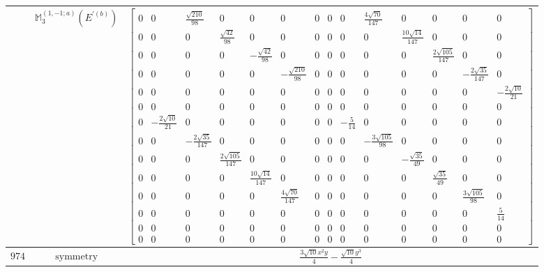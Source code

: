 \documentclass[fleqn,8pt,landscape]{jsarticle}
\begin{document}
\begin{longtable}{ccc}
$  $ & $ \mathbb{M}_{3}^{(1,-1;a)}(E^{\prime(b)}) $ & $ \begin{bmatrix} 0 & 0 & \frac{\sqrt{210}}{98} & 0 & 0 & 0 & 0 & 0 & 0 & \frac{4 \sqrt{70}}{147} & 0 & 0 & 0 & 0 \\ 0 & 0 & 0 & \frac{\sqrt{42}}{98} & 0 & 0 & 0 & 0 & 0 & 0 & \frac{10 \sqrt{14}}{147} & 0 & 0 & 0 \\ 0 & 0 & 0 & 0 & - \frac{\sqrt{42}}{98} & 0 & 0 & 0 & 0 & 0 & 0 & \frac{2 \sqrt{105}}{147} & 0 & 0 \\ 0 & 0 & 0 & 0 & 0 & - \frac{\sqrt{210}}{98} & 0 & 0 & 0 & 0 & 0 & 0 & - \frac{2 \sqrt{35}}{147} & 0 \\ 0 & 0 & 0 & 0 & 0 & 0 & 0 & 0 & 0 & 0 & 0 & 0 & 0 & - \frac{2 \sqrt{10}}{21} \\ 0 & 0 & 0 & 0 & 0 & 0 & 0 & 0 & 0 & 0 & 0 & 0 & 0 & 0 \\ 0 & - \frac{2 \sqrt{10}}{21} & 0 & 0 & 0 & 0 & 0 & 0 & - \frac{5}{14} & 0 & 0 & 0 & 0 & 0 \\ 0 & 0 & - \frac{2 \sqrt{35}}{147} & 0 & 0 & 0 & 0 & 0 & 0 & - \frac{3 \sqrt{105}}{98} & 0 & 0 & 0 & 0 \\ 0 & 0 & 0 & \frac{2 \sqrt{105}}{147} & 0 & 0 & 0 & 0 & 0 & 0 & - \frac{\sqrt{35}}{49} & 0 & 0 & 0 \\ 0 & 0 & 0 & 0 & \frac{10 \sqrt{14}}{147} & 0 & 0 & 0 & 0 & 0 & 0 & \frac{\sqrt{35}}{49} & 0 & 0 \\ 0 & 0 & 0 & 0 & 0 & \frac{4 \sqrt{70}}{147} & 0 & 0 & 0 & 0 & 0 & 0 & \frac{3 \sqrt{105}}{98} & 0 \\ 0 & 0 & 0 & 0 & 0 & 0 & 0 & 0 & 0 & 0 & 0 & 0 & 0 & \frac{5}{14} \\ 0 & 0 & 0 & 0 & 0 & 0 & 0 & 0 & 0 & 0 & 0 & 0 & 0 & 0 \\ 0 & 0 & 0 & 0 & 0 & 0 & 0 & 0 & 0 & 0 & 0 & 0 & 0 & 0 \end{bmatrix} $ \\ \hline
$ 974 $ & $ \text{symmetry} $ & $ \frac{3 \sqrt{10} x^{2} y}{4} - \frac{\sqrt{10} y^{3}}{4} $ \\

\end{longtable}
\end{document}
